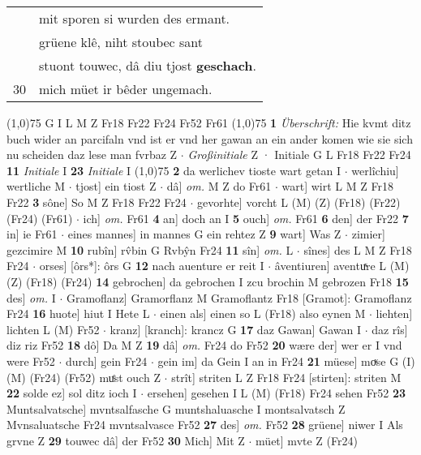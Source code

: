 \documentclass[8pt,a4paper,notitlepage]{article}
\begin{document}
\begin{table}[ht]
\begin{minipage}[t]{0.5\linewidth}
\begin{tabular}{rl}
 & mit sporen si wurden des ermant.\\ 
 & grüene klê, niht stoubec sant\\ 
 & stuont touwec, dâ diu tjost \textbf{geschach}.\\ 
30 & mich müet ir bêder ungemach.\\ 
\end{tabular}
\scriptsize
\line(1,0){75} \newline
G I L M Z Fr18 Fr22 Fr24 Fr52 Fr61 \newline
\line(1,0){75} \newline
\textbf{1} \textit{Überschrift:} Hie kvmt ditz buch wider an parcifaln vnd ist er vnd her gawan an ein ander komen wie sie sich nu scheiden daz lese man fvrbaz Z   $\cdot$ \textit{Großinitiale} Z  · Initiale G L Fr18 Fr22 Fr24  \textbf{11} \textit{Initiale} I  \textbf{23} \textit{Initiale} I  \newline
\line(1,0){75} \newline
\textbf{2} da werlichev tioste wart getan I  $\cdot$ werlîchiu] wertliche M  $\cdot$ tjost] ein tiost Z  $\cdot$ dâ] \textit{om.} M Z do Fr61  $\cdot$ wart] wirt L M Z Fr18 Fr22 \textbf{3} sône] So M Z Fr18 Fr22 Fr24  $\cdot$ gevorhte] vorcht L (M) (Z) (Fr18) (Fr22) (Fr24) (Fr61)  $\cdot$ ich] \textit{om.} Fr61 \textbf{4} an] doch an I \textbf{5} ouch] \textit{om.} Fr61 \textbf{6} den] der Fr22 \textbf{7} in] ie Fr61  $\cdot$ eines mannes] in mannes G ein rehtez Z \textbf{9} wart] Was Z  $\cdot$ zimier] gezcimire M \textbf{10} rubîn] rv̂bin G Rvbŷn Fr24 \textbf{11} sîn] \textit{om.} L  $\cdot$ sînes] des L M Z Fr18 Fr24  $\cdot$ orses] [ôrs*]: ôrs G \textbf{12} nach auenture er reit I  $\cdot$ âventiuren] aventuͯre L (M) (Z) (Fr18) (Fr24) \textbf{14} gebrochen] da gebrochen I zcu brochin M gebrozen Fr18 \textbf{15} des] \textit{om.} I  $\cdot$ Gramoflanz] Gramorflanz M Gramoflantz Fr18 [Gramot]: Gramoflanz Fr24 \textbf{16} huote] hiut I Hete L  $\cdot$ einen als] einen so L (Fr18) also eynen M  $\cdot$ liehten] lichten L (M) Fr52  $\cdot$ kranz] [kranch]: krancz G \textbf{17} daz Gawan] Gawan I  $\cdot$ daz rîs] diz riz Fr52 \textbf{18} dô] Da M Z \textbf{19} dâ] \textit{om.} Fr24 do Fr52 \textbf{20} wære der] wer er I vnd were Fr52  $\cdot$ durch] gein Fr24  $\cdot$ gein im] da Gein I an in Fr24 \textbf{21} müese] moͮse G (I) (M) (Fr24) (Fr52) muͤst ouch Z  $\cdot$ strît] striten L Z Fr18 Fr24 [stirten]: striten M \textbf{22} solde ez] sol ditz ioch I  $\cdot$ ersehen] gesehen I L (M) (Fr18) Fr24 sehen Fr52 \textbf{23} Muntsalvatsche] mvntsalfasche G muntshaluasche I montsalvatsch Z Mvnsaluatsche Fr24 mvntsalvasce Fr52 \textbf{27} des] \textit{om.} Fr52 \textbf{28} grüene] niwer I Als grvne Z \textbf{29} touwec dâ] der Fr52 \textbf{30} Mich] Mit Z  $\cdot$ müet] mvte Z (Fr24) \newline

\end{minipage}
\end{table}
\end{document}
